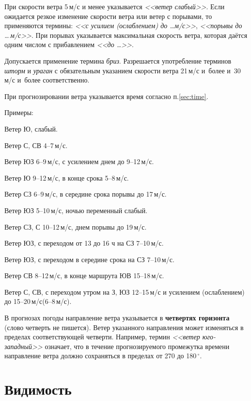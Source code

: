 \documentclass[a4paper, 12pt, twoside, final, book, russian, fittopage, cyremdash, openright]{ncc}
\newcommand{\mps}{\,м/с\xspace}
\newcommand{\gr}{\ensuremath{\,^\circ}\xspace}
\begin{document}
При скорости ветра 5\mps и менее указывается \textit{<<ветер слабый>>}. Если
ожидается резкое изменение скорости ветра или ветер с порывами, то
применяются термины: \textit{<<с усилием (ослаблением) до \ldots м/с>>}, \textit{<<порывы до
\ldots\mps>>}. При порывах указывается максимальная скорость ветра, которая
даётся одним числом с прибавлением \textit{<<до \ldots>>}.

Допускается применение термина \textit{бриз}.  Разрешается употребление
терминов \textit{шторм} и \textit{ураган} с обязательным указанием скорости
ветра 21\mps и~более и~30\mps и~более соответственно.

При прогнозировании ветра указывается время согласно п.\ref{sec:time}.

Примеры:
\begin{list}{}{}
\item Ветер Ю, слабый.
\item Ветер С, СВ 4--7\mps.
\item Ветер ЮЗ 6--9\mps, с усилением днем до 9--12\mps.
\item Ветер Ю 9--12\mps, в конце срока 5--8\mps.
\item Ветер СЗ 6--9\mps, в середине срока порывы до 17\mps.
\item Ветер ЮЗ 5--10\mps, ночью переменный слабый.
\item Ветер СЗ, С 10--12\mps, днем порывы до 19\mps.
\item Ветер ЮЗ, с переходом от 13 до 16 ч на СЗ 7--10\mps.
\item Ветер ЮЗ, с переходом в середине срока на СЗ 7--10\mps.
\item Ветер СВ 8--12\mps, в конце маршрута ЮВ 15--18\mps.
\item Ветер С, СВ, с переходом утром на З, ЮЗ 12--15\mps и усилением (ослаблением) до 15--20\mps (6--8\mps).
\end{list}

В прогнозах погоды направление ветра указывается в \textbf{четвертях
  горизонта} (слово четверть не пишется). Ветер указанного направления
может изменяться в пределах соответствующей четверти. Например, термин
\textit{<<ветер юго-западный>>} означает, что в течение
прогнозируемого промежутка времени направление ветра должно
сохраняться в пределах от 270 до 180\gr.

\section{Видимость}
\label{sec:visibility}
\end{document}
